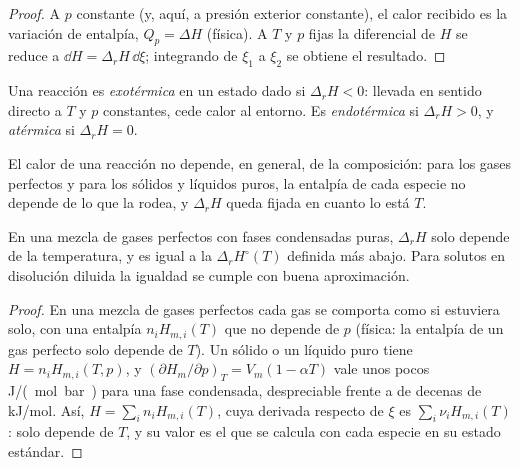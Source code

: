 \begin{proof}
A $p$ constante (y, aquí, a presión exterior constante), el calor recibido
es la variación de entalpía, $Q_p = \Delta H$ (física). A $T$ y $p$ fijas
la diferencial de $H$ se reduce a $\dd H = \Delta_r H\,\dd\xi$; integrando
de $\xi_1$ a $\xi_2$ se obtiene el resultado.
\end{proof}

\begin{definition}\label{def:b2:reaction-enthalpy:exothermic}
Una reacción es \emph{exotérmica} en un estado dado si
$\Delta_r H < 0$: llevada en sentido directo a $T$ y $p$ constantes, cede calor al
entorno. Es \emph{endotérmica} si $\Delta_r H >
0$, y \emph{atérmica} si $\Delta_r H = 0$.
\end{definition}

El calor de una reacción no depende, en general, de la composición:
para los gases perfectos y para los sólidos y líquidos puros, la entalpía de cada
especie no depende de lo que la rodea, y $\Delta_r H$ queda fijada
en cuanto lo está $T$.

\begin{proposition}\label{prop:b2:reaction-enthalpy:ideal}
En una mezcla de gases perfectos con fases condensadas puras, $\Delta_r H$
solo depende de la temperatura, y es igual a la  $\Delta_r H^\circ(T)$ definida más abajo. Para solutos en disolución
diluida la igualdad se cumple con buena aproximación.
\end{proposition}

\begin{proof}
En una mezcla de gases perfectos cada gas se comporta como si estuviera solo, con una entalpía
$n_iH_{m,i}(T)$ que no depende de $p$ (física: la entalpía de un
gas perfecto solo depende de $T$). Un sólido o un líquido puro tiene $H = n_iH_{m,i}(T,
p)$, y $(\partial H_m/\partial p)_T = V_m(1 - \alpha T)$ vale unos pocos
\unit{J/(mol.bar)} para una fase condensada, despreciable frente a  de decenas de \unit{kJ/mol}. Así, $H = \sum_in_iH_{m,i}(T)$, cuya
derivada respecto de $\xi$ es $\sum_i\nu_iH_{m,i}(T)$: solo depende de
$T$, y su valor es el que se calcula con cada especie en su
estado estándar.
\end{proof}

